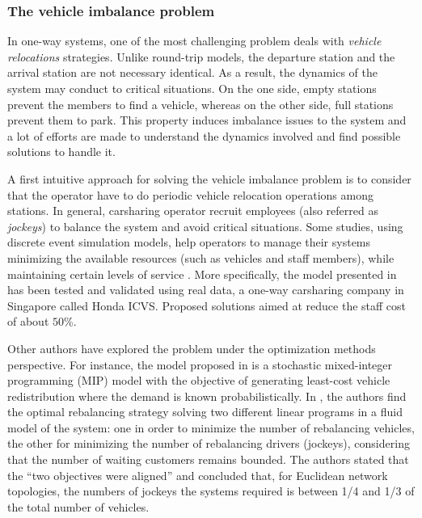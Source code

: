 \begin{bibunit}[ieeetr]
\subsubsection{The vehicle imbalance problem}
In one-way systems, one of the most challenging problem deals with \emph{vehicle relocations} strategies.
Unlike round-trip models, the departure station and the arrival station are not necessary identical.
As a result, the dynamics of the system may conduct to critical situations.
On the one side, empty stations prevent the members to find a vehicle, whereas on the other side, full stations prevent them to park.
This property induces imbalance issues to the system and a lot of efforts are made to understand the dynamics involved and find possible solutions to handle it.

\medskip
A first intuitive approach for solving the vehicle imbalance problem is to consider that the operator have to do periodic vehicle relocation operations among stations.
In general, carsharing operator recruit employees (also referred as \emph{jockeys}) to balance the system and avoid critical situations.
Some studies, using discrete event simulation models, help operators to manage their systems minimizing the available resources (such as vehicles and staff members), while maintaining certain levels of service \cite{barth_simulation_1999, kek_relocation_2006, kek_decision_2009}.
More specifically, the model presented in \cite{kek_decision_2009} has been tested and validated using real data, a one-way carsharing company in Singapore called Honda ICVS.
Proposed solutions aimed at reduce the staff cost of about $50$\%.

\medskip
Other authors have explored the problem under the optimization methods perspective.
For instance, the model proposed in \cite{nair_fleet_2011} is a stochastic mixed-integer programming (MIP) model with the objective of generating least-cost vehicle redistribution where the demand is known probabilistically.
In \cite{smith_rebalancing_2013}, the authors find the optimal rebalancing strategy solving two different linear programs in a fluid model of the system: one in order to minimize the number of rebalancing vehicles, the other for minimizing the number of rebalancing drivers (jockeys), considering that the number of waiting customers remains bounded.
The authors stated that the ``two objectives were aligned'' and concluded that, for Euclidean network topologies, the numbers of jockeys the systems required is between 1/4 and 1/3 of the total number of vehicles.


\end{bibunit}
